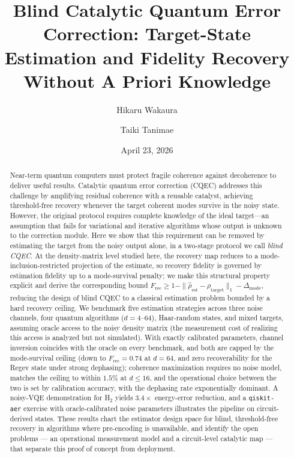 \documentclass[a4paper,onecolumn]{quantumarticle}
\newcommand{\Frec}{F_\mathrm{rec}}
\newcommand{\rhot}{\rho_\mathrm{target}}
\newcommand{\rhoe}{\hat{\rho}_\mathrm{est}}
\begin{document}
\title{Blind Catalytic Quantum Error Correction:
Target-State Estimation and Fidelity Recovery Without A Priori Knowledge}

\author{Hikaru Wakaura}

\author{Taiki Tanimae} 

\date{April 23, 2026}  

\begin{abstract}
Near-term quantum computers must protect fragile coherence against decoherence to deliver useful results. 
Catalytic quantum error correction (CQEC) addresses this challenge by amplifying residual coherence with a reusable catalyst, achieving threshold-free recovery whenever the target coherent modes survive in the noisy state.
However, the original protocol requires complete knowledge of the ideal target---an assumption that fails for variational and iterative algorithms whose output is unknown to the correction module.
Here we show that this requirement can be removed by estimating the target from the noisy output alone, in a two-stage protocol we call \emph{blind CQEC}.
At the density-matrix level studied here, the recovery map reduces to a mode-inclusion-restricted projection of the estimate, so recovery fidelity is governed by estimation fidelity up to a mode-survival penalty; we make this structural property explicit and derive the corresponding bound $\Frec \geq 1 - \|\rhoe - \rhot\|_1 - \Delta_\mathrm{mode}$, reducing the design of blind CQEC to a classical estimation problem bounded by a hard recovery ceiling.
We benchmark five estimation strategies across three noise channels, four quantum algorithms ($d = 4$--$64$), Haar-random states, and mixed targets, assuming oracle access to the noisy density matrix (the measurement cost of realizing this access is analyzed but not simulated).
With exactly calibrated parameters, channel inversion coincides with the oracle on every benchmark, and both are capped by the mode-survival ceiling (down to $\Frec = 0.74$ at $d = 64$, and zero recoverability for the Regev state under strong dephasing); coherence maximization requires no noise model, matches the ceiling to within $1.5\%$ at $d \leq 16$, and the operational choice between the two is set by calibration accuracy, with the dephasing rate exponentially dominant.
A noisy-VQE demonstration for H$_2$ yields $3.4\times$ energy-error reduction, and a \texttt{qiskit-aer} exercise with oracle-calibrated noise parameters illustrates the pipeline on circuit-derived states.
These results chart the estimator design space for blind, threshold-free recovery in algorithms where pre-encoding is unavailable, and identify the open problems --- an operational measurement model and a circuit-level catalytic map --- that separate this proof of concept from deployment.
\end{abstract}
\end{document}
